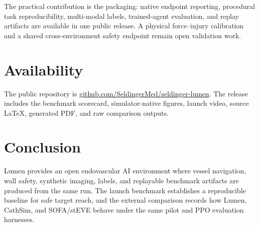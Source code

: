 \documentclass[11pt]{article}
\begin{document}
The practical contribution is the packaging: native endpoint reporting, procedural task reproducibility, multi-modal labels, trained-agent evaluation, and replay artifacts are available in one public release. A physical force--injury calibration and a shared cross-environment safety endpoint remain open validation work.

\section{Availability}

The public repository is \href{https://github.com/SeldingerMed/seldinger-lumen}{github.com/SeldingerMed/seldinger-lumen}. The release includes the benchmark scorecard, simulator-native figures, launch video, source LaTeX, generated PDF, and raw comparison outputs.

\section{Conclusion}

Lumen provides an open endovascular AI environment where vessel navigation, wall safety, synthetic imaging, labels, and replayable benchmark artifacts are produced from the same run. The launch benchmark establishes a reproducible baseline for safe target reach, and the external comparison records how Lumen, CathSim, and SOFA/stEVE behave under the same pilot and PPO evaluation harnesses.
\end{document}
